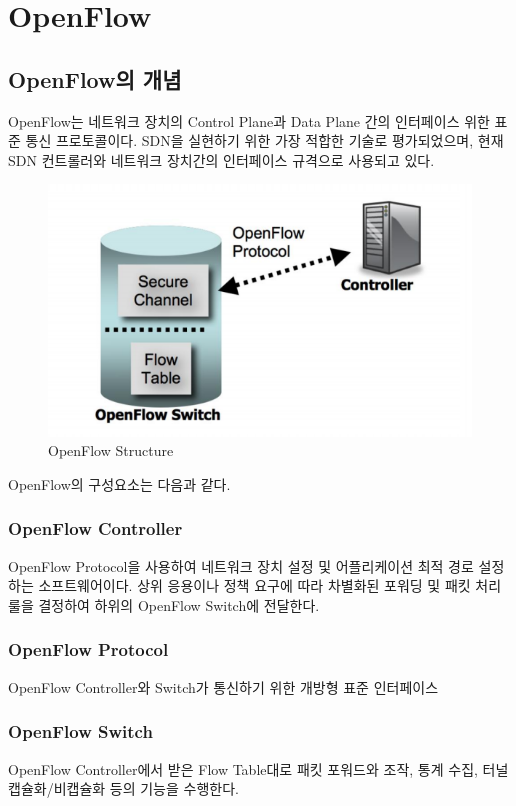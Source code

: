 \section{OpenFlow}
\subsection{OpenFlow의 개념}
    OpenFlow는 네트워크 장치의 Control Plane과 Data Plane 간의 인터페이스 위한 표준 통신 프로토콜이다. SDN을 실현하기 위한 가장 적합한 기술로 평가되었으며, 현재 SDN 컨트롤러와 네트워크 장치간의 인터페이스 규격으로 사용되고 있다. \\
    \vspace{-4mm}
    \begin{figure}[!h]\centering
		\includegraphics[width=.65\textwidth]{image/week05/2-1.png}
		\caption{\small OpenFlow Structure}
		\vspace{-10pt}
    \end{figure}
    
    OpenFlow의 구성요소는 다음과 같다. \\
    
    \subsubsection*{OpenFlow Controller}
    OpenFlow Protocol을 사용하여 네트워크 장치 설정 및 어플리케이션 최적 경로 설정하는 소프트웨어이다. 상위 응용이나 정책 요구에 따라 차별화된 포워딩 및 패킷 처리 룰을 결정하여 하위의 OpenFlow Switch에 전달한다. \\
    
    \subsubsection*{OpenFlow Protocol}
     OpenFlow Controller와 Switch가 통신하기 위한 개방형 표준 인터페이스 \\
     
    \subsubsection*{OpenFlow Switch}
    OpenFlow Controller에서 받은 Flow Table대로 패킷 포워드와 조작, 통계 수집, 터널 캡슐화/비캡슐화 등의 기능을 수행한다. \\
    
